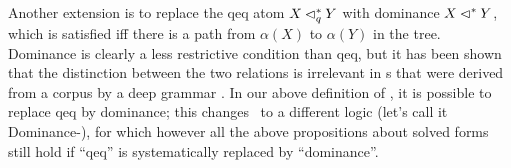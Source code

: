 Another extension is to replace
the qeq atom $X \lhd^*_q Y$ with dominance $X \lhd^* Y$, 
which is satisfied iff there is a path
from $\alpha(X)$ to $\alpha(Y)$ in the tree.  Dominance is clearly a
less restrictive condition than qeq, but it has been shown that the
distinction between the two relations is irrelevant in \mrs s that were
derived from a corpus by a deep grammar \cite{FucKolNieTha04}.  In our
above definition of \rmrs, it is possible to replace qeq by dominance;
this changes \rmrs\ to a different logic (let's call it
Dominance-\rmrs), for which however all the above propositions about
solved forms still hold if ``qeq'' is systematically replaced by
``dominance''. 


